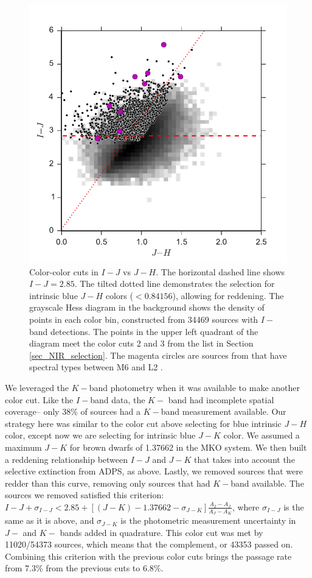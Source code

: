 \begin{figure}[ht!]
  \caption{Color-color cuts in $I-J$ vs $J-H$. The horizontal dashed line shows $I-J=2.85$.  The tilted dotted line demonstrates the selection for intrinsic blue $J-H$ colors ($<0.84156$), allowing for reddening.  The grayscale Hess diagram in the background shows the density of points in each color bin, constructed from 34469 sources with $I-$band detections.  The points in the upper left quadrant of the diagram meet the color cuts 2 and 3 from the list in Section \ref{sec_NIR_selection}.  The magenta circles are sources from \citet{allers06} that have spectral types between M6 and L2 \citep{2011ASPC..448..633G}.\label{fig_NIR_selection_JH}}
\centering
\includegraphics[scale=0.6]{chIMACS/figures/NIR_selection_allers_M6_L2}
\end{figure}

We leveraged the $K-$band photometry when it was available to make another color cut.  Like the $I-$band data, the $K-$ band had incomplete spatial coverage-- only 38\% of sources had a $K-$band measurement available.  Our strategy here was similar to the color cut above selecting for blue intrinsic $J-H$ color, except now we are selecting for intrinsic blue $J-K$ color.  We assumed a maximum $J-K$ for brown dwarfs of 1.37662 in the MKO system.  We then built a reddening relationship between $I-J$ and $J-K$ that takes into account the selective extinction from ADPS, as above.  Lastly, we removed sources that were redder than this curve, removing only sources that had $K-$band available.  The sources we removed satisfied this criterion:  $I-J + \sigma_{I-J} < 2.85 + [(J-K) - 1.37662 - \sigma_{J-K}]\frac{A_I-A_J}{A_J - A_K}$, where $\sigma_{I-J}$ is the same as it is above, and $\sigma_{J-K}$ is the photometric measurement uncertainty in $J-$ and $K-$ bands added in quadrature.  This color cut was met by 11020/54373 sources, which means that the complement, or 43353 passed on.  Combining this criterion with the previous color cuts brings the passage rate from 7.3\% from the previous cuts to 6.8\%.

